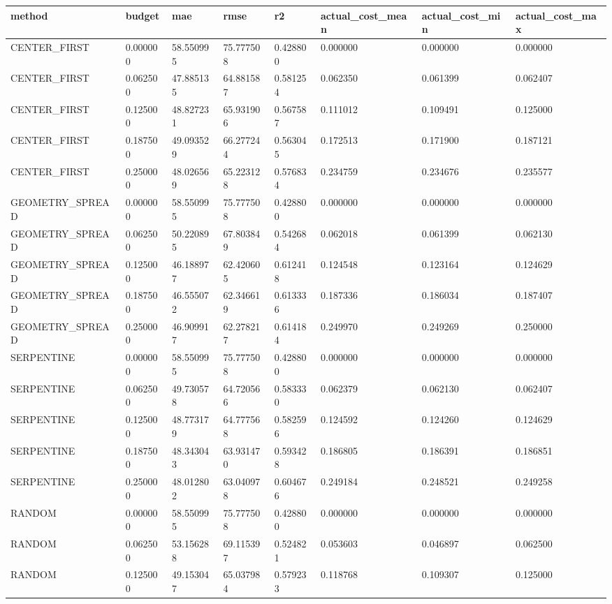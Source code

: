 \begin{tabular}{llllllll}
\hline
method & budget & mae & rmse & r2 & actual\_cost\_mean & actual\_cost\_min & actual\_cost\_max \\
\hline
CENTER\_FIRST & 0.000000 & 58.550995 & 75.777508 & 0.428800 & 0.000000 & 0.000000 & 0.000000 \\
CENTER\_FIRST & 0.062500 & 47.885135 & 64.881587 & 0.581254 & 0.062350 & 0.061399 & 0.062407 \\
CENTER\_FIRST & 0.125000 & 48.827231 & 65.931906 & 0.567587 & 0.111012 & 0.109491 & 0.125000 \\
CENTER\_FIRST & 0.187500 & 49.093529 & 66.277244 & 0.563045 & 0.172513 & 0.171900 & 0.187121 \\
CENTER\_FIRST & 0.250000 & 48.026569 & 65.223128 & 0.576834 & 0.234759 & 0.234676 & 0.235577 \\
GEOMETRY\_SPREAD & 0.000000 & 58.550995 & 75.777508 & 0.428800 & 0.000000 & 0.000000 & 0.000000 \\
GEOMETRY\_SPREAD & 0.062500 & 50.220895 & 67.803849 & 0.542684 & 0.062018 & 0.061399 & 0.062130 \\
GEOMETRY\_SPREAD & 0.125000 & 46.188977 & 62.420605 & 0.612418 & 0.124548 & 0.123164 & 0.124629 \\
GEOMETRY\_SPREAD & 0.187500 & 46.555072 & 62.346619 & 0.613336 & 0.187336 & 0.186034 & 0.187407 \\
GEOMETRY\_SPREAD & 0.250000 & 46.909917 & 62.278217 & 0.614184 & 0.249970 & 0.249269 & 0.250000 \\
SERPENTINE & 0.000000 & 58.550995 & 75.777508 & 0.428800 & 0.000000 & 0.000000 & 0.000000 \\
SERPENTINE & 0.062500 & 49.730578 & 64.720566 & 0.583330 & 0.062379 & 0.062130 & 0.062407 \\
SERPENTINE & 0.125000 & 48.773179 & 64.777568 & 0.582596 & 0.124592 & 0.124260 & 0.124629 \\
SERPENTINE & 0.187500 & 48.343043 & 63.931470 & 0.593428 & 0.186805 & 0.186391 & 0.186851 \\
SERPENTINE & 0.250000 & 48.012802 & 63.040978 & 0.604676 & 0.249184 & 0.248521 & 0.249258 \\
RANDOM & 0.000000 & 58.550995 & 75.777508 & 0.428800 & 0.000000 & 0.000000 & 0.000000 \\
RANDOM & 0.062500 & 53.156288 & 69.115397 & 0.524821 & 0.053603 & 0.046897 & 0.062500 \\
RANDOM & 0.125000 & 49.153047 & 65.037984 & 0.579233 & 0.118768 & 0.109307 & 0.125000 \\

\end{tabular}

